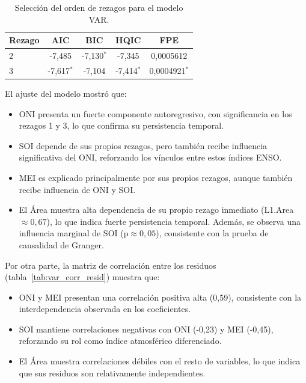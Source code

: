 \begin{table}[H]
    \centering
    \caption{Selección del orden de rezagos para el modelo VAR.}
    \label{tab:var_lags}
    \begin{tabular}{lcccc}
        \toprule
        \textbf{Rezago} & \textbf{AIC} & \textbf{BIC} & \textbf{HQIC} & \textbf{FPE} \\
        \midrule
        2 & -7,485 & -7,130$^\ast$ & -7,345 & 0,0005612 \\
        3 & -7,617$^\ast$ & -7,104 & -7,414$^\ast$ & 0,0004921$^\ast$ \\
        \bottomrule
    \end{tabular}
\end{table}

El ajuste del modelo mostró que:

\begin{itemize}
    \item ONI presenta un fuerte componente autoregresivo, con significancia en los rezagos 1 y 3, lo que confirma su persistencia temporal.
    \item SOI depende de sus propios rezagos, pero también recibe influencia significativa del ONI, reforzando los vínculos entre estos índices ENSO.
    \item MEI es explicado principalmente por sus propios rezagos, aunque también recibe influencia de ONI y SOI.
    \item El Área muestra alta dependencia de su propio rezago inmediato (L1.Area $\approx 0,67$), lo que indica fuerte persistencia temporal. Además, se observa una influencia marginal de SOI (p$\approx 0,05$), consistente con la prueba de causalidad de Granger.
\end{itemize}

Por otra parte, la matriz de correlación entre los residuos (tabla~\ref{tab:var_corr_resid}) muestra que:

\begin{itemize}
    \item ONI y MEI presentan una correlación positiva alta (0,59), consistente con la interdependencia observada en los coeficientes.
    \item SOI mantiene correlaciones negativas con ONI (-0,23) y MEI (-0,45), reforzando su rol como índice atmosférico diferenciado.
    \item El Área muestra correlaciones débiles con el resto de variables, lo que indica que sus residuos son relativamente independientes.
\end{itemize}


